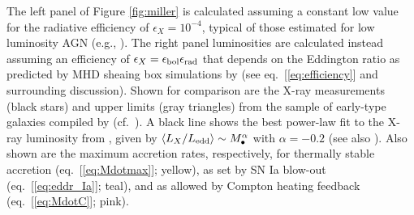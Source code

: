 \documentclass[usenatbib,fleqn]{mn2e}
\newcommand{\Mbh}[1][]{M_{\bullet#1}}
\begin{document}
The left panel of Figure \ref{fig:miller} is calculated assuming a
constant low value for the radiative efficiency of $\epsilon_X =
10^{-4}$, typical of those estimated for low luminosity AGN (e.g.,
\citealt{Ho:2009a}).  The right panel luminosities are calculated
instead assuming an efficiency of $\epsilon_X= \epsilon_{\rm
  bol}\epsilon_{\rm rad}$ that depends on the Eddington ratio as
predicted by MHD sheaing box simulations by \citet{Sharma+2007} (see
eq.~[\ref{eq:efficiency}] and surrounding discussion).  Shown for
comparison are the X-ray measurements (black stars) and upper limits
(gray triangles) from the sample of early-type galaxies compiled by
\citet{Miller+15} (cf.~\citealt{Gallo+10}).  A black line shows the
best power-law fit to the X-ray luminosity from \citet{Miller+15},
given by $\langle L_X/L_{\rm edd}\rangle \sim \Mbh^\alpha$ with
$\alpha = -0.2$ (see also \citealt{Zhang+09, Pellegrini10, Gallo+10}).
Also shown are the maximum accretion rates, respectively, for
thermally stable accretion (eq.~[\ref{eq:Mdotmax}]; yellow), as set by
SN Ia blow-out (eq.~[\ref{eq:eddr_Ia}]; teal), and as allowed by
Compton heating feedback (eq.~[\ref{eq:MdotC}]; pink).
\end{document}
